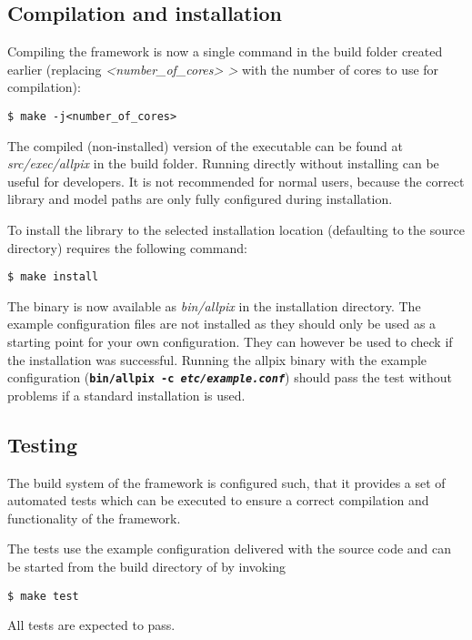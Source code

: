 \subsection{Compilation and installation}
Compiling the framework is now a single command in the build folder created earlier (replacing \textit{\textless number\_of\_cores> \textgreater} with the number of cores to use for compilation):
\begin{verbatim}
$ make -j<number_of_cores>
\end{verbatim}
The compiled (non-installed) version of the executable can be found at \textit{src/exec/allpix} in the build folder.
Running \apsq directly without installing can be useful for developers.
It is not recommended for normal users, because the correct library and model paths are only fully configured during installation.

To install the library to the selected installation location (defaulting to the source directory) requires the following command:
\begin{verbatim}
$ make install
\end{verbatim}

The binary is now available as \textit{bin/allpix} in the installation directory.
The example configuration files are not installed as they should only be used as a starting point for your own configuration.
They can however be used to check if the installation was successful.
Running the allpix binary with the example configuration (\texttt{\textbf{bin/allpix -c \textit{etc/example.conf}}}) should pass the test without problems if a standard installation is used.

\subsection{Testing}
The build system of the framework is configured such, that it provides a set of automated tests which can be executed to ensure a correct compilation and functionality of the framework.

The tests use the example configuration delivered with the source code and can be started from the build directory of \apsq by invoking
\begin{verbatim}
$ make test
\end{verbatim}

All tests are expected to pass.
